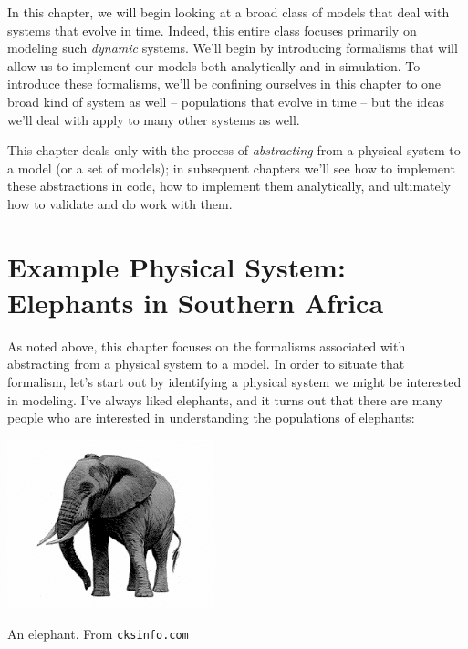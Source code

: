 In this chapter, we will begin looking at a broad class of models that deal with systems that evolve in time.  Indeed, this entire class focuses primarily on modeling such {\it dynamic} systems.   We'll begin by introducing formalisms that will allow us to implement our models both analytically and in simulation.  To introduce these formalisms, we'll be confining ourselves in this chapter to one broad kind of system as well -- populations that evolve in time -- but the ideas we'll deal with apply to many other systems as well.

This chapter deals only with the process of {\it abstracting} from a physical system to a model (or a set of models); in subsequent chapters we'll see how to implement these abstractions in code, how to implement them analytically, and ultimately how to validate and do work with them.  

\section{Example Physical System: Elephants in Southern Africa}

As noted above, this chapter focuses on the formalisms associated with abstracting from a physical system to a model.  In order to situate that formalism, let's start out by identifying a physical system we might be interested in modeling.  I've always liked elephants, and it turns out that there are many people who are interested in understanding the populations of elephants:

\begin{marginfigure}
\includegraphics[width=6cm]{figs/Elephant}
\caption{An elephant.  From {\tt cksinfo.com}}
\end{marginfigure}

